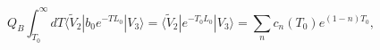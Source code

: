 \begin{equation} %
  Q_B \int_{T_0}^\infty dT
 \langle \widetilde{V}_{2}| b_0e^{-T L_0} | V_3 \rangle 
 =  \langle\widetilde{V}_{2}| e^{-T_0 L_0}|V_3 \rangle
= \sum_{n}^{} c_n (T_0) e^{(1-n)T_0},
\label{eq:qt-regulated}
\end{equation} 
